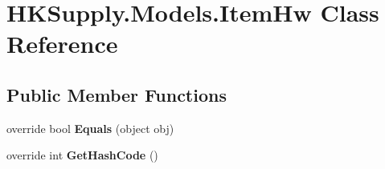 \hypertarget{class_h_k_supply_1_1_models_1_1_item_hw}{}\section{H\+K\+Supply.\+Models.\+Item\+Hw Class Reference}
\label{class_h_k_supply_1_1_models_1_1_item_hw}
\subsection*{Public Member Functions}
\begin{DoxyCompactItemize}
\item 
\mbox{\label{class_h_k_supply_1_1_models_1_1_item_hw_aa56bea6c02d5bdfe56ca6620e07099c1}} 
override bool {\bfseries Equals} (object obj)
\item 
\mbox{\label{class_h_k_supply_1_1_models_1_1_item_hw_a7d56d930fe36cf05609a26f6ee656c2b}} 
override int {\bfseries Get\+Hash\+Code} ()
\end{DoxyCompactItemize}
